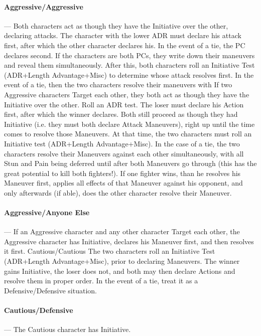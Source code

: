 \documentclass[oneside,11pt,english]{book}
\begin{document}
\paragraph{\label{par:Aggressive/Aggressive}Aggressive/Aggressive}---\quad
Both characters act as though they have the Initiative over the other, declaring attacks. The
character with the lower ADR must declare his attack first, after which the other character
declares his. In the event of a tie, the PC declares second. If the characters are both PCs, they
write down their maneuvers and reveal them simultaneously.
After this, both characters roll an Initiative Test (ADR+Length Advantage+Misc) to determine
whose attack resolves first. In the event of a tie, then the two characters resolve their maneuvers
with %
If two Aggressive characters Target each other, they both act as though they have the Initiative
over the other. Roll an ADR test. The loser must declare his Action first, after which the winner
declares. Both still proceed as though they had Initiative (i.e. they must both declare Attack
Maneuvers), right up until the time comes to resolve those Maneuvers. At that time, the two
characters must roll an Initiative test (ADR+Length Advantage+Misc). In the case of a tie, the
two characters resolve their Maneuvers against each other simultaneously, with all Stun and Pain
being deferred until after both Maneuvers go through (this has the great potential to kill both
fighters!). If one fighter wins, than he resolves his Maneuver first, applies all effects of that
Maneuver against his opponent, and only afterwards (if able), does the other character resolve
their Maneuver.
\paragraph{\label{par:Aggressive/Anyone Else}Aggressive/Anyone Else}---\quad
If an Aggressive character and any other character Target each other, the Aggressive character
has Initiative, declares his Maneuver first, and then resolves it first.
Cautious/Cautious
The two characters roll an Initiative Test (ADR+Length Advantage+Misc), prior to declaring
Maneuvers. The winner gains Initiative, the loser does not, and both may then declare Actions
and resolve them in proper order. In the event of a tie, treat it as a Defensive/Defensive situation.
\paragraph{\label{par:Cautious/Defensive}Cautious/Defensive}---\quad
The Cautious character has Initiative.
\end{document}

